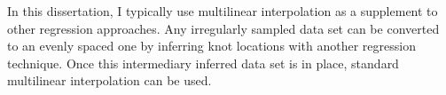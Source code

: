 In this dissertation, I typically use multilinear interpolation as a supplement to  other regression approaches.
Any irregularly sampled data set can be converted to an evenly spaced one by inferring knot locations with another regression technique.
Once this intermediary inferred data set is in place, standard multilinear interpolation can be used.












